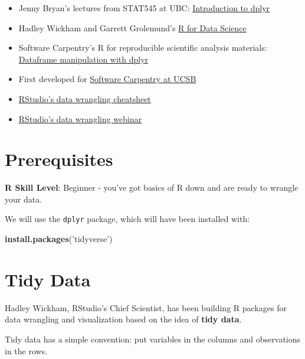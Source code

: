\documentclass[]{book}
\newenvironment{Shaded}{\begin{snugshade}}{\end{snugshade}}
\newcommand{\KeywordTok}[1]{\textcolor[rgb]{0.13,0.29,0.53}{\textbf{#1}}}
\newcommand{\StringTok}[1]{\textcolor[rgb]{0.31,0.60,0.02}{#1}}
\newcommand{\NormalTok}[1]{#1}
\providecommand{\tightlist}{%
  \setlength{\itemsep}{0pt}\setlength{\parskip}{0pt}}
\theoremstyle{definition}
\theoremstyle{definition}
\theoremstyle{definition}
\theoremstyle{remark}
\begin{document}
\begin{itemize}
\tightlist
\item
  Jenny Bryan's lectures from STAT545 at UBC:
  \href{http://stat545.com/block009_dplyr-intro.html}{Introduction to
  dplyr}
\item
  Hadley Wickham and Garrett Grolemund's \href{http://r4ds.had.co.nz/}{R
  for Data Science}
\item
  Software Carpentry's R for reproducible scientific analysis materials:
  \href{http://swcarpentry.github.io/r-novice-gapminder/13-dplyr.html}{Dataframe
  manipulation with dplyr}
\item
  First developed for
  \href{http://remi-daigle.github.io/2016-04-15-UCSB/dplyr/}{Software
  Carpentry at UCSB}
\item
  \href{http://www.rstudio.com/wp-content/uploads/2015/02/data-wrangling-cheatsheet.pdf}{RStudio's
  data wrangling cheatsheet}
\item
  \href{https://www.rstudio.com/resources/webinars/data-wrangling-with-r-and-rstudio/}{RStudio's
  data wrangling webinar}
\end{itemize}

\section{Prerequisites}\label{prerequisites-1}

\textbf{R Skill Level}: Beginner - you've got basics of R down and are
ready to wrangle your data.

We will use the \texttt{dplyr} package, which will have been installed
with:

\begin{Shaded}
\begin{Highlighting}[]
\KeywordTok{install.packages}\NormalTok{(}\StringTok{'tidyverse'}\NormalTok{)}
\end{Highlighting}
\end{Shaded}

\section{Tidy Data}\label{tidy-data}

Hadley Wickham, RStudio's Chief Scientist, has been building R packages
for data wrangling and visualization based on the idea of \textbf{tidy
data}.

Tidy data has a simple convention: put variables in the columns and
observations in the rows.
\end{document}
